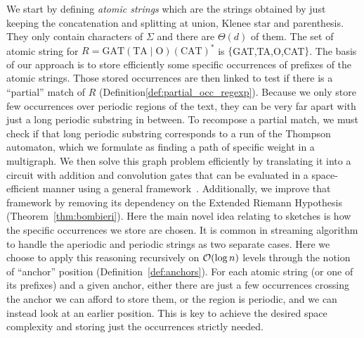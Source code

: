 We start by defining \emph{atomic strings} which are the strings obtained by just keeping the concatenation and splitting at union, Klenee star and parenthesis. They only contain characters of $\Sigma$ and there are $\Theta(d)$ of them. The set of atomic string for $R= \mathrm{GAT}(\mathrm{TA}\mid \mathrm{O})(\mathrm{CAT})^*$  is $\{$GAT,TA,O,CAT$\}$.
%
The basis of our approach is to store efficiently some specific occurrences of prefixes of the atomic strings. Those stored occurrences are then linked to test if there is a “partial” match of $R$ (Definition\ref*{def:partial_occ_regexp}). Because we only store few occurrences over periodic regions of the text, they can be very far apart with just a long periodic substring in between. To recompose a partial match, we must check if that long periodic substring corresponds to a run of the Thompson automaton, which we formulate as finding a path of specific weight in a multigraph. We then solve this graph problem efficiently by translating it into a circuit with addition and convolution gates that can be evaluated in a space-efficient manner using a general framework~\cite{LokshtanovN10,Bringmann17}. Additionally, we improve that framework by removing its dependency on the Extended Riemann Hypothesis (Theorem~\ref{thm:bombieri}). 
Here the main novel idea relating to sketches is how the specific occurrences we store are chosen. It is common in streaming algorithm to handle the aperiodic and periodic strings as two separate cases. Here we choose to apply this reasoning recursively on $\mathcal{O}(\log n)$ levels through the notion of ``anchor'' position (Definition~\ref{def:anchors}). For each atomic string (or one of its prefixes) and a given anchor, either there are just a few occurrences crossing the anchor we can afford to store them, or the region is periodic, and we can instead look at an earlier position. This is key to achieve the desired space complexity and storing just the occurrences strictly needed.









